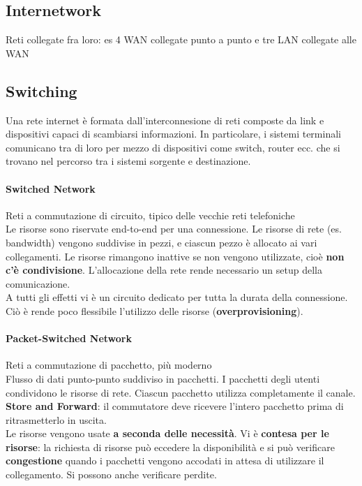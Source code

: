 \documentclass[10pt]{article}
\begin{document}
\subsection{Internetwork}
Reti collegate fra loro: es 4 WAN collegate punto a punto e tre LAN collegate alle WAN

\subsection{Switching}
Una rete internet è formata dall'interconnesione di reti composte da link e dispositivi capaci di scambiarsi informazioni.
In particolare, i sistemi terminali comunicano tra di loro per mezzo di dispositivi come switch, router ecc. che si trovano nel percorso tra i sistemi sorgente e destinazione.
\paragraph{Switched Network} Reti a commutazione di circuito, tipico delle vecchie reti telefoniche\\
Le risorse sono riservate end-to-end per una connessione. Le risorse di rete (es. bandwidth) vengono suddivise in pezzi, e ciascun pezzo è allocato ai vari collegamenti. Le risorse rimangono inattive se non vengono utilizzate, cioè \textbf{non c'è condivisione}. L'allocazione della rete rende necessario un setup della comunicazione.\\A tutti gli effetti vi è un circuito dedicato per tutta la durata della connessione. Ciò è rende poco flessibile l'utilizzo delle risorse (\textbf{overprovisioning}).
\paragraph{Packet-Switched Network} Reti a commutazione di pacchetto, più moderno\\
Flusso di dati punto-punto suddiviso in pacchetti. I pacchetti degli utenti condividono le risorse di rete. Ciascun pacchetto utilizza completamente il canale.\\\textbf{Store and Forward}: il commutatore deve ricevere l'intero pacchetto prima di ritrasmetterlo in uscita.\\Le risorse vengono usate \textbf{a seconda delle necessità}. Vi è \textbf{contesa per le risorse}: la richiesta di risorse può eccedere la disponibilità e si può verificare \textbf{congestione} quando i pacchetti vengono accodati in attesa di utilizzare il collegamento. Si possono anche verificare perdite.
\end{document}
